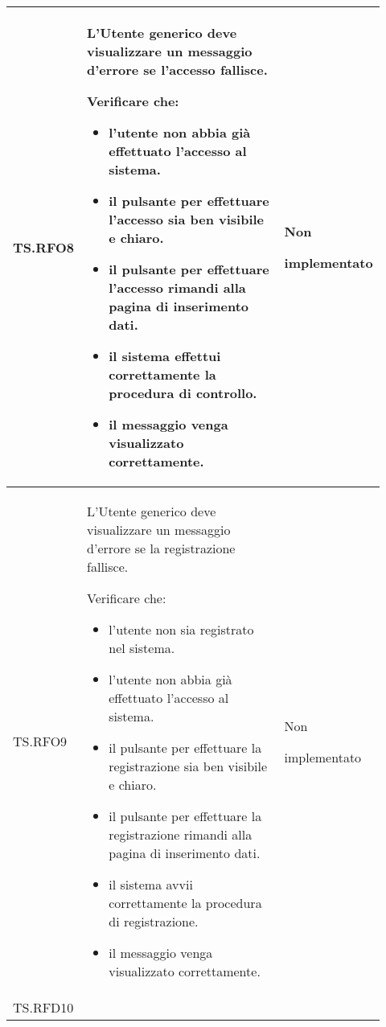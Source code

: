 \begin{longtable}{|p{0.10\linewidth}|p{0.70\linewidth}|p{0.12\linewidth}|}
	\hline
	TS.RFO8                                                                                                                         &
	L’Utente generico deve visualizzare un messaggio d’errore se l’accesso fallisce. \par
	Verificare che:
	\begin{itemize}
		\item l'utente non abbia già effettuato l'accesso al sistema.
		\item il pulsante per effettuare l'accesso sia ben visibile e chiaro.
		\item il pulsante per effettuare l'accesso rimandi alla pagina di inserimento dati.
		\item il sistema effettui correttamente la procedura di controllo.
		\item il messaggio venga visualizzato correttamente.
	\end{itemize}                                             &
	Non \par implementato                                                                                                                                                   \\
	\hline
	TS.RFO9                                                                                                                         &
	L’Utente generico deve visualizzare un messaggio d’errore se la registrazione fallisce. \par
	Verificare che:
	\begin{itemize}
		\item l'utente non sia registrato nel sistema.
		\item l'utente non abbia già effettuato l'accesso al sistema.
		\item il pulsante per effettuare la registrazione sia ben visibile e chiaro.
		\item il pulsante per effettuare la registrazione rimandi alla pagina di inserimento dati.
		\item il sistema avvii correttamente la procedura di registrazione.
		\item il messaggio venga visualizzato correttamente.
	\end{itemize}                                      &
	Non \par implementato                                                                                                                                                   \\
	\hline
	TS.RFD10                                                                                                                        &

\end{longtable}
